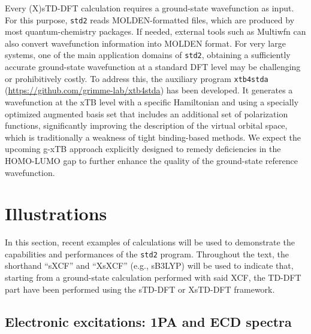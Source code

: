 \documentclass[%
 aip,
 amsmath,amssymb,
preprint,%
]{revtex4-2}
\begin{document}
Every (X)sTD-DFT calculation requires a ground-state wavefunction as input. 
For this purpose, \texttt{std2} reads MOLDEN-formatted files, which are produced by most quantum-chemistry packages.
If needed, external tools such as Multiwfn\cite{luMultiwfnMultifunctionalWavefunction2012} can also convert wavefunction information into MOLDEN format.
For very large systems, one of the main application domains of \texttt{std2},\cite{beaujeanAllAtomQuantumMechanical2021,lescosSelfassemblingStructureNonlinear2021,loffelsenderAllAtomQuantumMechanical2025} obtaining a sufficiently accurate ground-state wavefunction at a standard DFT level may be challenging or prohibitively costly. 
To address this, the auxiliary program \texttt{xtb4stda} (\url{https://github.com/grimme-lab/xtb4stda}) has been developed.\cite{grimmeUltrafastComputationElectronic2016}
It generates a wavefunction at the xTB level with a specific Hamiltonian and using a specially optimized augmented basis set that includes an additional set of polarization functions, significantly improving the description of the virtual orbital space, which is traditionally a weakness of tight binding-based methods. 
We expect the upcoming g-xTB approach\cite{froitzheimGxTBGeneralPurposeExtended2025} explicitly designed to remedy deficiencies in the HOMO-LUMO gap  to further enhance the quality of the ground-state reference wavefunction.


\clearpage
\section{Illustrations}\label{sec:illu}

In this section, recent examples of calculations will be used to demonstrate the capabilities and performances of the \texttt{std2} program. 
Throughout the text, the shorthand ``sXCF'' and ``XsXCF'' (e.g., sB3LYP) will be used to indicate that, starting from a ground-state calculation performed with said XCF, the TD-DFT part have been performed using the sTD-DFT or XsTD-DFT framework.


\subsection{Electronic excitations: 1PA and ECD spectra}
\end{document}
